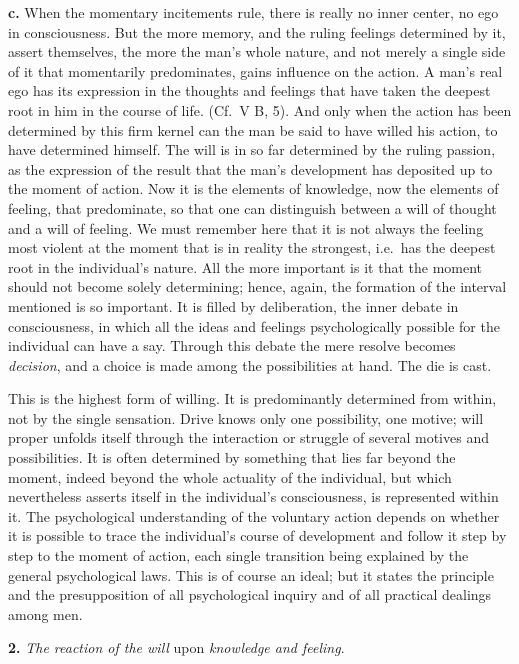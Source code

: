 \documentclass[12pt,a4paper]{book}
\newcommand{\opage}[1]{\marginnote{\footnotesize\textit{[#1]}}}
\begin{document}
\textbf{c.} When the momentary incitements rule, there is really no inner
center, no ego in consciousness. But the more memory, and the ruling
feelings determined by it, assert themselves, the more the man's whole
nature, and not merely a single side of it that momentarily
predominates, gains influence on the action. A man's real ego has its
expression in the thoughts and feelings that have taken the deepest root
in him in the course of life. (Cf.\ V B, 5). And only when the action has
been determined by this firm kernel can the man be said to have willed
his action, to have determined himself. The will is in so far determined
by the ruling passion, as the expression of the result that
\opage{384}the man's development has deposited up to the moment of action.
Now it is the elements of knowledge, now the elements of feeling, that
predominate, so that one can distinguish between a will of thought and a
will of feeling. We must remember here that it is not always the feeling
most violent at the moment that is in reality the strongest, i.e.\ has
the deepest root in the individual's nature. All the more important is
it that the moment should not become solely determining; hence, again,
the formation of the interval mentioned is so important. It is filled by
deliberation, the inner debate in consciousness, in which all the ideas
and feelings psychologically possible for the individual can have a say.
Through this debate the mere resolve becomes \emph{decision}, and a
choice is made among the possibilities at hand. The die is cast.

This is the highest form of willing. It is predominantly determined from
within, not by the single sensation. Drive knows only one possibility,
one motive; will proper unfolds itself through the interaction or
struggle of several motives and possibilities. It is often determined by
something that lies far beyond the moment, indeed beyond the whole
actuality of the individual, but which nevertheless asserts itself in the
individual's consciousness, is represented within it. The psychological
understanding of the voluntary action depends on whether it is possible
to trace the individual's course of development and follow it step by
step to the moment of action, each single transition being explained by
the general psychological laws. This is of course an ideal; but it states
the principle and the presupposition of all psychological inquiry and of
all practical dealings among men.

\textbf{2.} \emph{The reaction of the will} upon \emph{knowledge and
feeling}.
\end{document}
